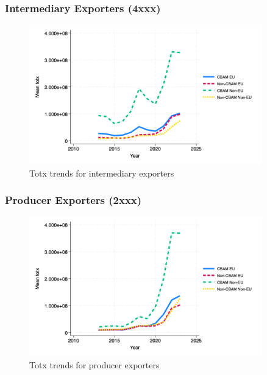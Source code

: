 \documentclass{article}
\begin{document}
\subsubsection{Intermediary Exporters (4xxx)}
\begin{figure}[h!]
\centering
\includegraphics[width=0.9\textwidth]{totx_ei.png}
\caption{Totx trends for intermediary exporters}
\label{fig:totx_ei}
\end{figure}

\subsubsection{Producer Exporters (2xxx)}
\begin{figure}[h!]
\centering
\includegraphics[width=0.9\textwidth]{totx_ep.png}
\caption{Totx trends for producer exporters}
\label{fig:totx_ep}
\end{figure}
\end{document}
